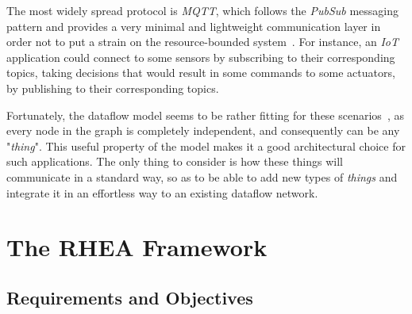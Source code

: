 \documentclass[sigplan,screen,review,anonymous]{acmart}
\begin{document}
The most widely spread protocol is \textit{MQTT}, which follows the \textit{PubSub}
messaging pattern and provides a very minimal and lightweight communication layer
in order not to put a strain on the resource-bounded system~\cite{mqtt}.
For instance, an \textit{IoT} application could connect to some sensors by
subscribing to their corresponding topics, taking decisions that would result in
some commands to some actuators, by publishing to their corresponding topics.

Fortunately, the dataflow model seems to be rather fitting for these
scenarios~\cite{iot_dataflow}, as every node in the graph is completely
independent, and consequently can be any "\textit{thing}". This useful property
of the model makes it a good architectural choice for such applications. The
only thing to consider is how these things will communicate in a standard way,
so as to be able to add new types of \textit{things} and integrate it in an
effortless way to an existing dataflow network.

\section{The RHEA Framework} \label{sec:approach}

\subsection{Requirements and Objectives} \label{sec:requirements}
\end{document}
